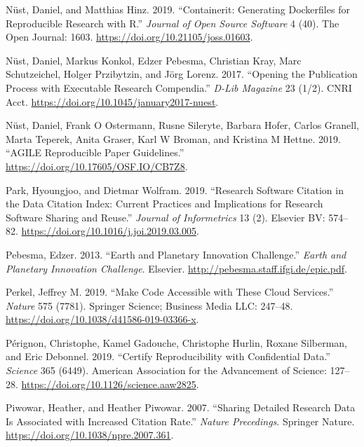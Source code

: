 \documentclass[onecolumn]{article}
\begin{document}
\leavevmode\hypertarget{ref-nust2019containerit}{}%
Nüst, Daniel, and Matthias Hinz. 2019. ``Containerit: Generating
Dockerfiles for Reproducible Research with R.'' \emph{Journal of Open
Source Software} 4 (40). The Open Journal: 1603.
\url{https://doi.org/10.21105/joss.01603}.

\leavevmode\hypertarget{ref-nust2017opening}{}%
Nüst, Daniel, Markus Konkol, Edzer Pebesma, Christian Kray, Marc
Schutzeichel, Holger Przibytzin, and Jörg Lorenz. 2017. ``Opening the
Publication Process with Executable Research Compendia.'' \emph{D-Lib
Magazine} 23 (1/2). CNRI Acct.
\url{https://doi.org/10.1045/january2017-nuest}.

\leavevmode\hypertarget{ref-nuest2019agile}{}%
Nüst, Daniel, Frank O Ostermann, Rusne Sileryte, Barbara Hofer, Carlos
Granell, Marta Teperek, Anita Graser, Karl W Broman, and Kristina M
Hettne. 2019. ``AGILE Reproducible Paper Guidelines.''
\url{https://doi.org/10.17605/OSF.IO/CB7Z8}.

\leavevmode\hypertarget{ref-Park_2019}{}%
Park, Hyoungjoo, and Dietmar Wolfram. 2019. ``Research Software Citation
in the Data Citation Index: Current Practices and Implications for
Research Software Sharing and Reuse.'' \emph{Journal of Informetrics} 13
(2). Elsevier BV: 574--82.
\url{https://doi.org/10.1016/j.joi.2019.03.005}.

\leavevmode\hypertarget{ref-edzer2013}{}%
Pebesma, Edzer. 2013. ``Earth and Planetary Innovation Challenge.''
\emph{Earth and Planetary Innovation Challenge}. Elsevier.
\url{http://pebesma.staff.ifgi.de/epic.pdf}.

\leavevmode\hypertarget{ref-Perkel_2019}{}%
Perkel, Jeffrey M. 2019. ``Make Code Accessible with These Cloud
Services.'' \emph{Nature} 575 (7781). Springer Science; Business Media
LLC: 247--48. \url{https://doi.org/10.1038/d41586-019-03366-x}.

\leavevmode\hypertarget{ref-perignon2019certify}{}%
Pérignon, Christophe, Kamel Gadouche, Christophe Hurlin, Roxane
Silberman, and Eric Debonnel. 2019. ``Certify Reproducibility with
Confidential Data.'' \emph{Science} 365 (6449). American Association for
the Advancement of Science: 127--28.
\url{https://doi.org/10.1126/science.aaw2825}.

\leavevmode\hypertarget{ref-piwowar2007sharing}{}%
Piwowar, Heather, and Heather Piwowar. 2007. ``Sharing Detailed Research
Data Is Associated with Increased Citation Rate.'' \emph{Nature
Precedings}. Springer Nature.
\url{https://doi.org/10.1038/npre.2007.361}.
\end{document}
